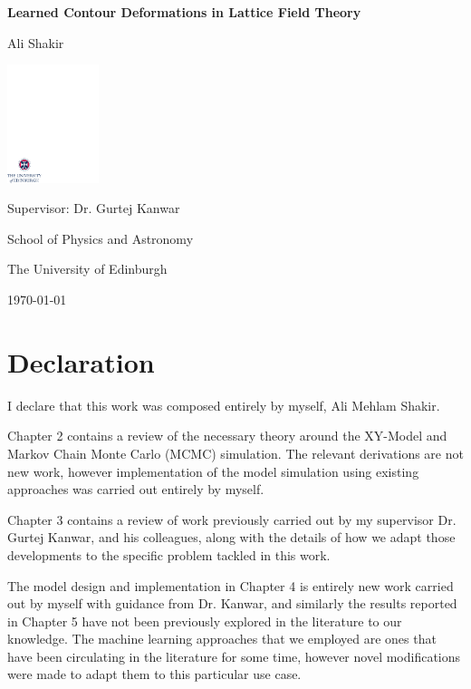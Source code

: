 \documentclass[12pt]{article}
\begin{document}
\begin{titlepage}
	\centering
	\vspace*{2cm}
	{\Huge\bfseries Learned Contour Deformations in Lattice Field Theory\par}
	\vspace{2cm}
	{\Large Ali Shakir\par}
	\vspace{1.5cm}
	\vfill
	\includegraphics[width=0.2\textwidth]{crest.pdf}\par
	\vspace{0.5cm}
	{\large Supervisor: Dr. Gurtej Kanwar\par}
	\vspace{0.5cm}
	{\large School of Physics and Astronomy\par}
	{\large The University of Edinburgh\par}
	\vspace{1cm}
	{\large \today\par}
\end{titlepage}

\section*{Declaration}

I declare that this work was composed entirely by myself, Ali Mehlam Shakir.

Chapter 2 contains a review of the necessary theory around the XY-Model and Markov Chain Monte Carlo (MCMC) simulation.
The relevant derivations are not new work, however implementation of the model simulation using existing approaches was
carried out entirely by myself.

Chapter 3 contains a review of work previously carried out by my supervisor Dr. Gurtej Kanwar, and his colleagues, along with
the details of how we adapt those developments to the specific problem tackled in this work.

The model design and implementation in Chapter 4 is entirely new work carried out by myself with guidance from Dr. Kanwar,
and similarly the results reported in Chapter 5 have not been previously explored in the literature to our knowledge. The
machine learning approaches that we employed are ones that have been circulating in the literature for some time, however
novel modifications were made to adapt them to this particular use case.
\end{document}
